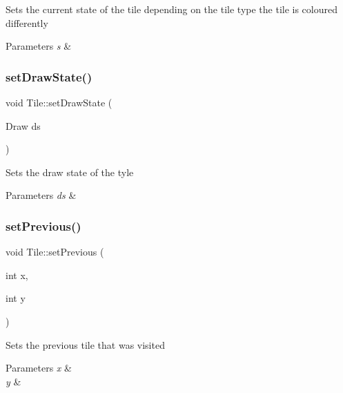 Sets the current state of the tile depending on the tile type the tile is coloured differently 


\begin{DoxyParams}{Parameters}
{\em s} & \\
\hline
\end{DoxyParams}
\mbox{\label{class_tile_a4a26f555d4268b105e94dc789fe4a74d}} 
\subsubsection{\texorpdfstring{setDrawState()}{setDrawState()}}
{\footnotesize\ttfamily void Tile\+::set\+Draw\+State (\begin{DoxyParamCaption}\item[{Draw}]{ds }\end{DoxyParamCaption})}



Sets the draw state of the tyle 


\begin{DoxyParams}{Parameters}
{\em ds} & \\
\hline
\end{DoxyParams}
\mbox{\label{class_tile_a9358e7dd4f3537140f0d03fb24663b7c}} 
\subsubsection{\texorpdfstring{setPrevious()}{setPrevious()}}
{\footnotesize\ttfamily void Tile\+::set\+Previous (\begin{DoxyParamCaption}\item[{int}]{x,  }\item[{int}]{y }\end{DoxyParamCaption})}



Sets the previous tile that was visited 


\begin{DoxyParams}{Parameters}
{\em x} & \\
\hline
{\em y} & \\
\hline
\end{DoxyParams}
\mbox{\label{class_tile_ad6c3bfc01ae47ff98aba94890ce104a6}} 
